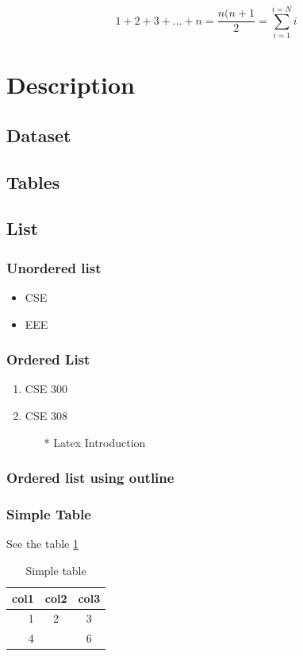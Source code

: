 \documentclass{article}
\begin{document}
\begin{equation}
    1 + 2 + 3 + \dots + n = 
    \frac{n(n+1}{2} = \sum_{i=1}^{i=N}i
\end{equation}
\section{Description}
\subsection{Dataset}
\subsection{Tables}
\subsection{List}
\subsubsection{Unordered list}
\begin{itemize}
    \item CSE
    \item EEE
\end{itemize}

\subsubsection{Ordered List}
\begin{enumerate}
    \item CSE 300
    \item CSE 308
    \begin{enumerate}
        \item[*] Latex Introduction
    \end{enumerate}
\end{enumerate}

\subsubsection{Ordered list using outline}

\subsubsection{Simple Table}
See the table \ref{tab:Multi col table}
\begin{table}[]
    \centering
    \begin{tabular}{|r|c|c|}
        \hline
        col1 & col2 & col3\\
        \hline
        1 & 2 & 3\\
        \cline{1-2}
        4 &  & 6\\
        \hline
    \end{tabular}
    \caption{Simple table}
    \label{tab:Multi col table}
\end{table}
\end{document}
